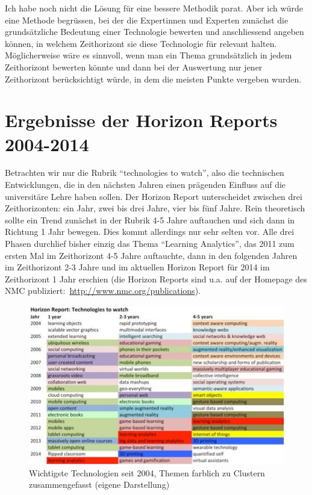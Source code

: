 \documentclass[a4paper,
fontsize=11pt,
oneside,
numbers=noperiodatend,
parskip=half-,
bibliography=totoc,
final
]{scrartcl}
\begin{document}
Ich habe noch nicht die Lösung für eine bessere Methodik parat. Aber ich
würde eine Methode begrüssen, bei der die Expertinnen und Experten
zunächst die grundsätzliche Bedeutung einer Technologie bewerten und
anschliessend angeben können, in welchem Zeithorizont sie diese
Technologie für relevant halten. Möglicherweise wäre es sinnvoll, wenn
man ein Thema grundsätzlich in jedem Zeithorizont bewerten könnte und
dann bei der Auswertung nur jener Zeithorizont berücksichtigt würde, in
dem die meisten Punkte vergeben wurden.

\section*{Ergebnisse der Horizon Reports
2004-2014}\label{ergebnisse-der-horizon-reports-2004-2014}

Betrachten wir nur die Rubrik \enquote{technologies to watch}, also die
technischen Entwicklungen, die in den nächsten Jahren einen prägenden
Einfluss auf die universitäre Lehre haben sollen. Der Horizon Report
unterscheidet zwischen drei Zeithorizonten: ein Jahr, zwei bis drei
Jahre, vier bis fünf Jahre. Rein theoretisch sollte ein Trend zunächst
in der Rubrik 4-5 Jahre auftauchen und sich dann in Richtung 1 Jahr
bewegen. Dies kommt allerdings nur sehr selten vor. Alle drei Phasen
durchlief bisher einzig das Thema \enquote{Learning Analytics}, das 2011
zum ersten Mal im Zeithorizont 4-5 Jahre auftauchte, dann in den
folgenden Jahren im Zeithorizont 2-3 Jahre und im aktuellen Horizon
Report für 2014 im Zeithorizont 1 Jahr erschien (die Horizon Reports
sind u.a. auf der Homepage des NMC
publiziert:~\url{http://www.nmc.org/publications}).~

\begin{figure}[htbp]
\centering
\includegraphics{./img/02-Themen_Horizon.jpg}
\caption{Wichtigste Technologien seit 2004, Themen farblich zu Clustern
zusammengefasst (eigene Darstellung)}
\end{figure}
\end{document}

